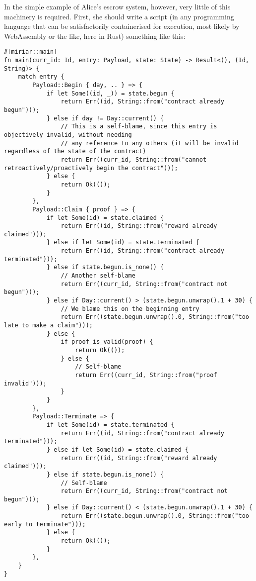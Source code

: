\documentclass{extreport}
\begin{document}
In the simple example of Alice's escrow system, however, very little of this machinery is required. First, she should write a script (in any programming language that can be satisfactorily containerised for execution, most likely by WebAssembly or the like, here in Rust) something like this:

\begin{verbatim}
#[miriar::main]
fn main(curr_id: Id, entry: Payload, state: State) -> Result<(), (Id, String)> {
    match entry {
        Payload::Begin { day, .. } => {
            if let Some((id, _)) = state.begun {
                return Err((id, String::from("contract already begun")));
            } else if day != Day::current() {
                // This is a self-blame, since this entry is objectively invalid, without needing
                // any reference to any others (it will be invalid regardless of the state of the contract)
                return Err((curr_id, String::from("cannot retroactively/proactively begin the contract")));
            } else {
                return Ok(());
            }
        },
        Payload::Claim { proof } => {
            if let Some(id) = state.claimed {
                return Err((id, String::from("reward already claimed")));
            } else if let Some(id) = state.terminated {
                return Err((id, String::from("contract already terminated")));
            } else if state.begun.is_none() {
                // Another self-blame
                return Err((curr_id, String::from("contract not begun")));
            } else if Day::current() > (state.begun.unwrap().1 + 30) {
                // We blame this on the beginning entry
                return Err((state.begun.unwrap().0, String::from("too late to make a claim")));
            } else {
                if proof_is_valid(proof) {
                    return Ok(());
                } else {
                    // Self-blame
                    return Err((curr_id, String::from("proof invalid")));
                }
            }
        },
        Payload::Terminate => {
            if let Some(id) = state.terminated {
                return Err((id, String::from("contract already terminated")));
            } else if let Some(id) = state.claimed {
                return Err((id, String::from("reward already claimed")));
            } else if state.begun.is_none() {
                // Self-blame
                return Err((curr_id, String::from("contract not begun")));
            } else if Day::current() < (state.begun.unwrap().1 + 30) {
                return Err((state.begun.unwrap().0, String::from("too early to terminate")));
            } else {
                return Ok(());
            }
        },
    }
}


\end{verbatim}
\end{document}
